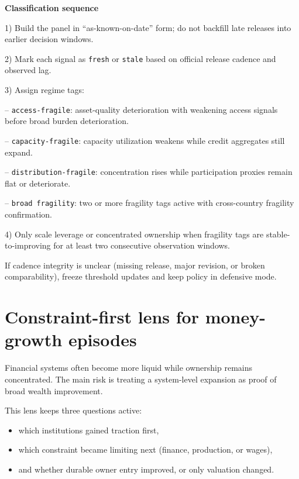 \documentclass[11pt,openany]{book}
\begin{document}
\begin{notebox}
\textbf{Classification sequence}\par
1) Build the panel in ``as-known-on-date'' form; do not backfill late releases into earlier decision windows.\par
2) Mark each signal as \texttt{fresh} or \texttt{stale} based on official release cadence and observed lag.\par
3) Assign regime tags:\par
\hspace*{1.2em}-- \texttt{access-fragile}: asset-quality deterioration with weakening access signals before broad burden deterioration.\par
\hspace*{1.2em}-- \texttt{capacity-fragile}: capacity utilization weakens while credit aggregates still expand.\par
\hspace*{1.2em}-- \texttt{distribution-fragile}: concentration rises while participation proxies remain flat or deteriorate.\par
\hspace*{1.2em}-- \texttt{broad fragility}: two or more fragility tags active with cross-country fragility confirmation.\par
4) Only scale leverage or concentrated ownership when fragility tags are stable-to-improving for at least two consecutive observation windows.
\end{notebox}

If cadence integrity is unclear (missing release, major revision, or broken comparability), freeze threshold updates and keep policy in defensive mode.

\section{Constraint-first lens for money-growth episodes}

Financial systems often become more liquid while ownership remains concentrated.
The main risk is treating a system-level expansion as proof of broad wealth improvement.

This lens keeps three questions active:
\begin{itemize}
  \item which institutions gained traction first,
  \item which constraint became limiting next (finance, production, or wages),
  \item and whether durable owner entry improved, or only valuation changed.
\end{itemize}
\end{document}
